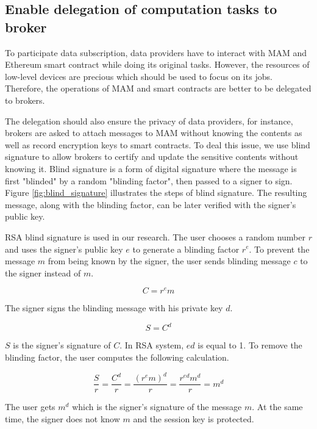 \documentclass[conference]{IEEEtran}
\begin{document}
\subsection{Enable delegation of computation tasks to broker}
To participate data subscription, data providers have to interact with MAM and Ethereum smart contract while doing its original tasks. However, the resources of low-level devices are precious which should be used to focus on its jobs. Therefore, the operations of MAM and smart contracts are better to be delegated to brokers. 

The delegation should also ensure the privacy of data providers, for instance, brokers are asked to attach messages to MAM without knowing the contents as well as record encryption keys to smart contracts. To deal this issue, we use blind signature\cite{blindSig} to allow brokers to certify and update the sensitive contents without knowing it. Blind signature is a form of digital signature where the message is first "blinded" by a random "blinding factor", then passed to a signer to sign. Figure \ref{fig:blind_signature} illustrates the steps of blind signature. The resulting message, along with the blinding factor, can be later verified with the signer's public key. 

RSA blind signature\cite{cryptoNote} is used in our research. The user chooses a random number $r$ and uses the signer's public key $e$ to generate a blinding factor $r^e$. To prevent the message $m$ from being known by the signer, the user sends blinding message $c$ to the signer instead of $m$.

\begin{equation}
C = r^e m
\end{equation}

The signer signs the blinding message with his private key $d$.

\begin{equation}
S = C^d
\end{equation}

$S$ is the signer's signature of $C$. In RSA system, $ed$ is equal to 1. To remove the blinding factor, the user computes the following calculation.

\begin{equation}
\frac{S}{r}= \frac{C^d}{r} = \frac{(r^e m)^d}{r} = \frac{r^{ed} m^d}{r} = m^d
\end{equation}
 
The user gets $m^d$ which is the signer's signature of the message $m$. At the same time, the signer does not know $m$ and the session key is protected. 
\end{document}
